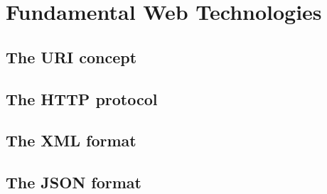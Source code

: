 
\section{Fundamental Web Technologies}
\label{sec:web_fundamentals}

\subsection{The \gls{URI} concept}
\label{subsec:uri_concept}


\subsection{The \gls{HTTP} protocol}
\label{subsec:http_protocol}


\subsection{The \gls{XML} format}
\label{subsec:xml_format}


\subsection{The \gls{JSON} format}
\label{subsec:json_format}


